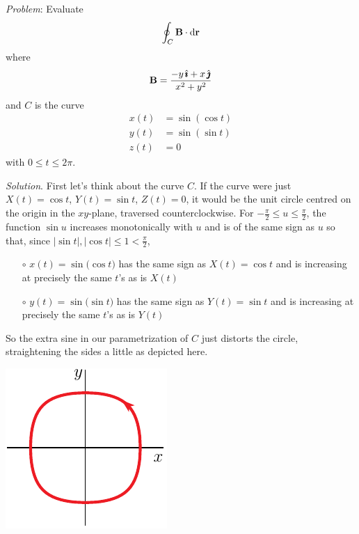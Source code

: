 \begin{eg}\label{eg:greenC}
\noindent\textit{Problem}:
Evaluate
\begin{equation*}
\oint_C\mathbf{B}\cdot\mathrm{d}\mathbf{r}
\end{equation*}
where
\begin{equation*}
\mathbf{B} = \frac{-y\,\hat{\pmb{\imath}}+x\,\hat{\pmb{\jmath}}}{x^2+y^2}
\end{equation*}
and $C$ is the curve
\begin{align*}
x(t) &= \sin(\cos t) \\
y(t) &= \sin(\sin t) \\
z(t) &= 0
\end{align*}
with $0\le t\le 2\pi$.

\medskip
\noindent\textit{Solution}.
First let's think about the curve $C$. If the curve were just
$X(t)=\cos t$, $Y(t)=\sin t$, $Z(t)=0$, it would be the unit circle
centred on the origin in the $xy$-plane, traversed counterclockwise.
For $-\frac{\pi}{2}\le u\le \frac{\pi}{2}$, the function $\sin u$ 
increases monotonically with  $u$ and is of the same sign as $u$ so that,  
since $|\sin t|,|\cos t|\le 1<\frac{\pi}{2}$,
\begin{itemize}\itemsep1pt \parskip0pt  %
\item[$\circ$]
$x(t) = \sin\big(\cos t)$ has the same sign as $X(t)=\cos t$ and is increasing
at precisely the same $t$'s as is $X(t)$
\item[$\circ$]
$y(t) = \sin\big(\sin t)$ has the same sign as $Y(t)=\sin t$ and is increasing
at precisely the same $t$'s as is $Y(t)$
\end{itemize}
So the extra sine in our 
parametrization of $C$ just distorts the circle, straightening the sides a little
as depicted here.
\begin{nfig}
\begin{center}
    \includegraphics{dcircleA.pdf}
\end{center}

\end{nfig}
\end{eg}

